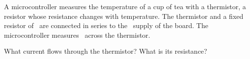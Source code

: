 A microcontroller measures the temperature of a cup of tea with a thermistor, a resistor whose resistance changes with temperature. The thermistor and a fixed resistor of \RaO\ are connected in series to the \VzO\ supply of the board. The microcontroller measures \VTO\ across the thermistor.

\begin{abcliste}
\abc What current flows through the thermistor?
\abc What is its resistance?
\end{abcliste}
